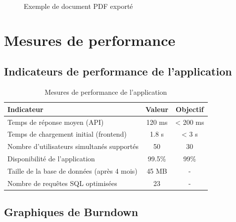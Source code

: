 \documentclass[12pt,a4paper]{report}
\begin{document}
\begin{figure}[H]
\centering
{}
\caption{Exemple de document PDF exporté}
\end{figure}

\section{Mesures de performance}

\subsection{Indicateurs de performance de l'application}

\begin{table}[H]
\centering
\renewcommand{\arraystretch}{1.4}
\begin{tabular}{|l|c|c|}
\hline
\textbf{Indicateur} & \textbf{Valeur} & \textbf{Objectif} \\
\hline
Temps de réponse moyen (API) & 120 ms & < 200 ms \\
\hline
Temps de chargement initial (frontend) & 1.8 s & < 3 s \\
\hline
Nombre d'utilisateurs simultanés supportés & 50 & 30 \\
\hline
Disponibilité de l'application & 99.5\% & 99\% \\
\hline
Taille de la base de données (après 4 mois) & 45 MB & - \\
\hline
Nombre de requêtes SQL optimisées & 23 & - \\
\hline
\end{tabular}
\caption{Mesures de performance de l'application}
\end{table}

\subsection{Graphiques de Burndown}
\end{document}
